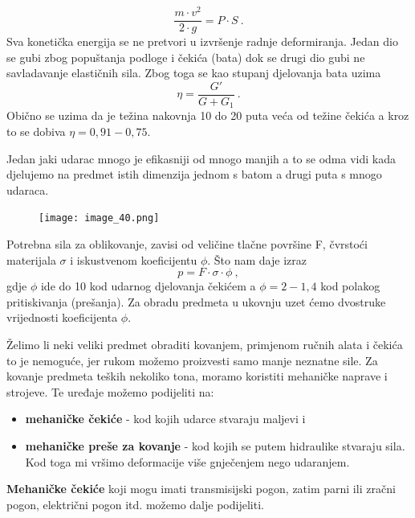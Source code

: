 \documentclass[a4paper,12pt]{article}
\numberwithin{figure}{section}
\begin{document}
\begin{equation}
\frac{m\cdot v^{2}}{2 \cdot g} = P\cdot S\:.
\end{equation}
Sva konetička energija se ne pretvori u izvršenje radnje deformiranja. Jedan dio se gubi zbog popuštanja podloge i čekića (bata) dok se drugi dio gubi ne savladavanje elastičnih sila. Zbog toga se kao  stupanj djelovanja bata uzima 
\begin{equation}
\eta = \frac{G'}{G + G_{1}}\:.
\end{equation}
Obično se uzima da je težina nakovnja 10 do 20 puta veća od težine čekića a kroz to se dobiva $\eta = 0,91-0,75$.\par 
Jedan jaki udarac mnogo je efikasniji od mnogo manjih a to se odma vidi kada djelujemo na predmet istih dimenzija jednom s batom a drugi puta s mnogo udaraca.
\begin{figure}[!h]
\centering
\texttt{[image: image\_40.png]}
\end{figure}
\FloatBarrier
Potrebna sila za oblikovanje, zavisi od veličine tlačne površine F, čvrstoći materijala $\sigma$ i iskustvenom koeficijentu $\phi$. Što nam daje izraz
\begin{equation}
p = F\cdot \sigma \cdot \phi \:,
\end{equation}
gdje $\phi$ ide do 10 kod udarnog djelovanja čekićem a $\phi = 2 - 1,4$ kod polakog pritiskivanja (prešanja). Za obradu predmeta u ukovnju uzet ćemo dvostruke vrijednosti koeficijenta $\phi$.\par 
Želimo li neki veliki predmet obraditi kovanjem, primjenom ručnih alata i čekića to je nemoguće, jer rukom možemo proizvesti samo manje neznatne sile. Za kovanje predmeta teških nekoliko tona, moramo koristiti mehaničke naprave i strojeve. Te uređaje možemo podijeliti na:
\begin{itemize}
\item \textbf{mehaničke čekiće} - kod kojih udarce stvaraju maljevi i
\item \textbf{mehaničke preše za kovanje} - kod kojih se putem hidraulike stvaraju sila. Kod toga mi vršimo deformacije više gnječenjem nego udaranjem.
\end{itemize}
\par
\textbf{Mehaničke čekiće} koji mogu imati transmisijski pogon, zatim parni ili zračni pogon, električni pogon itd. možemo dalje podijeliti.
\end{document}
